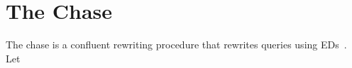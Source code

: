 \documentclass[preprint]{sigplanconf}
\begin{document}
%
%


\section{The Chase}

The chase is a confluent rewriting procedure that rewrites queries using EDs~\cite{foundations}.   Let
\end{document}
